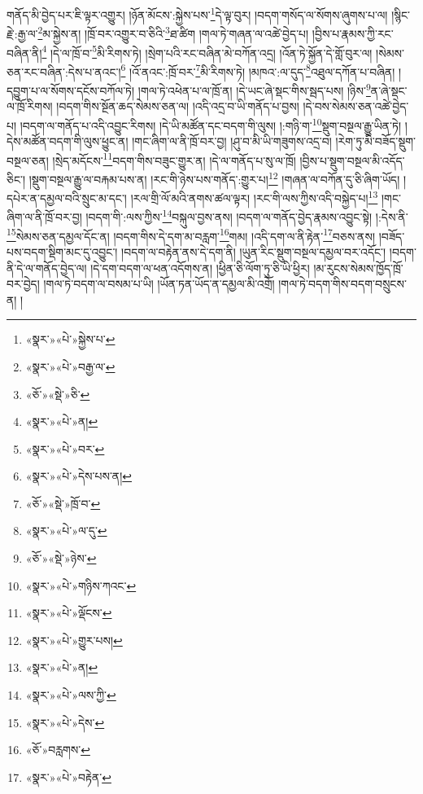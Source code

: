 གནོད་མི་བྱེད་པར་ཇི་ལྟར་འགྱུར། །ཉོན་མོངས་:སྐྱེས་པས་\footnote{«སྣར་»«པེ་»སྐྱེས་པ་}དེ་ལྟ་བུར། །བདག་གསོད་ལ་སོགས་ཞུགས་པ་ལ། །སྙིང་རྗེ་:རྒྱ་ལ་\footnote{«སྣར་»«པེ་»བརྒྱ་ལ་}མ་སྐྱེས་ན། །ཁྲོ་བར་འགྱུར་བ་ཅིའི་\footnote{«ཅོ་»«སྡེ་»ཅི་}ཐ་ཚིག །གལ་ཏེ་གཞན་ལ་འཚེ་བྱེད་པ། །བྱིས་པ་རྣམས་ཀྱི་རང་བཞིན་ནི།\footnote{«སྣར་»«པེ་»ན།} །དེ་ལ་ཁྲོ་བ་\footnote{«སྣར་»«པེ་»བར་}མི་རིགས་ཏེ། །སྲེག་པའི་རང་བཞིན་མེ་བཀོན་འདྲ། །འོན་ཏེ་སྐྱོན་དེ་གློ་བུར་ལ། །སེམས་ཅན་རང་བཞིན་:དེས་པ་ནའང་།\footnote{«སྣར་»«པེ་»དེས་པས་ན།} །འོ་ནའང་:ཁྲོ་བར་\footnote{«ཅོ་»«སྡེ་»ཁྲོ་བ་}མི་རིགས་ཏེ། །མཁའ་:ལ་དུད་\footnote{«སྣར་»«པེ་»ལ་དུ་}འཐུལ་དཀོན་པ་བཞིན། །དབྱུག་པ་ལ་སོགས་དངོས་བཀོལ་ཏེ། །གལ་ཏེ་འཕེན་པ་ལ་ཁྲོ་ན། །དེ་ཡང་ཞེ་སྡང་གིས་སྦད་པས། །ཉིས་\footnote{«ཅོ་»«སྡེ་»ཉེས་}ན་ཞེ་སྡང་ལ་ཁྲོ་རིགས། །བདག་གིས་སྔོན་ཆད་སེམས་ཅན་ལ། །འདི་འདྲ་བ་ཡི་གནོད་པ་བྱས། །དེ་བས་སེམས་ཅན་འཚེ་བྱེད་པ། །བདག་ལ་གནོད་པ་འདི་འབྱུང་རིགས། །དེ་ཡི་མཚོན་དང་བདག་གི་ལུས། །:གཉི་ག་\footnote{«སྣར་»«པེ་»གཉིས་ཀའང་}སྡུག་བསྔལ་རྒྱུ་ཡིན་ཏེ། །དེས་མཚོན་བདག་གི་ལུས་ཕྱུང་ན། །གང་ཞིག་ལ་ནི་ཁྲོ་བར་བྱ། །ཤུ་བ་མི་ཡི་གཟུགས་འདྲ་བ། །རེག་ཏུ་མི་བཟོད་སྡུག་བསྔལ་ཅན། །སྲེད་མདོངས་\footnote{«སྣར་»«པེ་»ལྡོངས་}བདག་གིས་བཟུང་གྱུར་ན། །དེ་ལ་གནོད་པ་སུ་ལ་ཁྲོ། །བྱིས་པ་སྡུག་བསྔལ་མི་འདོད་ཅིང་། །སྡུག་བསྔལ་རྒྱུ་ལ་བརྐམ་པས་ན། །རང་གི་ཉེས་པས་གནོད་:གྱུར་པ།\footnote{«སྣར་»«པེ་»གྱུར་པས།} །གཞན་ལ་བཀོན་དུ་ཅི་ཞིག་ཡོད། །དཔེར་ན་དམྱལ་བའི་སྲུང་མ་དང་། །རལ་གྲི་ལོ་མའི་ནགས་ཚལ་ལྟར། །རང་གི་ལས་ཀྱིས་འདི་བསྐྱེད་པ།\footnote{«སྣར་»«པེ་»ན།} །གང་ཞིག་ལ་ནི་ཁྲོ་བར་བྱ། །བདག་གི་:ལས་ཀྱིས་\footnote{«སྣར་»«པེ་»ལས་ཀྱི་}བསྐུལ་བྱས་ནས། །བདག་ལ་གནོད་བྱེད་རྣམས་འབྱུང་སྟེ། །:དེས་ནི་\footnote{«སྣར་»«པེ་»དེས་}སེམས་ཅན་དམྱལ་དོང་ན། །བདག་གིས་དེ་དག་མ་བརླག་\footnote{«ཅོ་»བརླགས་}གམ། །འདི་དག་ལ་ནི་རྟེན་\footnote{«སྣར་»«པེ་»བརྟེན་}བཅས་ནས། །བཟོད་པས་བདག་སྡིག་མང་དུ་འབྱུང་། །བདག་ལ་བརྟེན་ནས་དེ་དག་ནི། །ཡུན་རིང་སྡུག་བསྔལ་དམྱལ་བར་འདོང་། །བདག་ནི་དེ་ལ་གནོད་བྱེད་ལ། །དེ་དག་བདག་ལ་ཕན་འདོགས་ན། །ཕྱིན་ཅི་ལོག་ཏུ་ཅི་ཡི་ཕྱིར། །མ་རུངས་སེམས་ཁྱོད་ཁྲོ་བར་བྱེད། །གལ་ཏེ་བདག་ལ་བསམ་པ་ཡི། །ཡོན་ཏན་ཡོད་ན་དམྱལ་མི་འགྲོ། །གལ་ཏེ་བདག་གིས་བདག་བསྲུངས་ན། །
